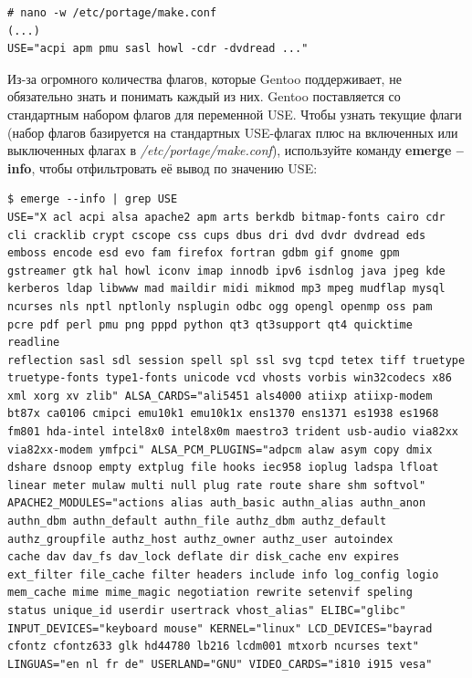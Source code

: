 \documentclass[10pt]{book}
\begin{document}
\begin{tcolorbox}
\begin{lstlisting}
# nano -w /etc/portage/make.conf
(...)
USE="acpi apm pmu sasl howl -cdr -dvdread ..."
\end{lstlisting}
\end{tcolorbox}

Из-за огромного количества флагов, которые Gentoo поддерживает, не обязательно знать и понимать каждый из них. Gentoo поставляется со стандартным набором флагов для переменной USE.
Чтобы узнать текущие флаги (набор флагов базируется на стандартных USE-флагах плюс на включенных или выключенных флагах в  \textit{/etc/portage/make.conf}), используйте команду \textbf{emerge --info}, чтобы отфильтровать её вывод по значению USE:

\begin{tcolorbox}
\begin{lstlisting}
$ emerge --info | grep USE
USE="X acl acpi alsa apache2 apm arts berkdb bitmap-fonts cairo cdr
cli cracklib crypt cscope css cups dbus dri dvd dvdr dvdread eds
emboss encode esd evo fam firefox fortran gdbm gif gnome gpm
gstreamer gtk hal howl iconv imap innodb ipv6 isdnlog java jpeg kde
kerberos ldap libwww mad maildir midi mikmod mp3 mpeg mudflap mysql
ncurses nls nptl nptlonly nsplugin odbc ogg opengl openmp oss pam
pcre pdf perl pmu png pppd python qt3 qt3support qt4 quicktime readline
reflection sasl sdl session spell spl ssl svg tcpd tetex tiff truetype
truetype-fonts type1-fonts unicode vcd vhosts vorbis win32codecs x86
xml xorg xv zlib" ALSA_CARDS="ali5451 als4000 atiixp atiixp-modem
bt87x ca0106 cmipci emu10k1 emu10k1x ens1370 ens1371 es1938 es1968
fm801 hda-intel intel8x0 intel8x0m maestro3 trident usb-audio via82xx
via82xx-modem ymfpci" ALSA_PCM_PLUGINS="adpcm alaw asym copy dmix
dshare dsnoop empty extplug file hooks iec958 ioplug ladspa lfloat
linear meter mulaw multi null plug rate route share shm softvol"
APACHE2_MODULES="actions alias auth_basic authn_alias authn_anon
authn_dbm authn_default authn_file authz_dbm authz_default
authz_groupfile authz_host authz_owner authz_user autoindex
cache dav dav_fs dav_lock deflate dir disk_cache env expires
ext_filter file_cache filter headers include info log_config logio
mem_cache mime mime_magic negotiation rewrite setenvif speling
status unique_id userdir usertrack vhost_alias" ELIBC="glibc"
INPUT_DEVICES="keyboard mouse" KERNEL="linux" LCD_DEVICES="bayrad
cfontz cfontz633 glk hd44780 lb216 lcdm001 mtxorb ncurses text"
LINGUAS="en nl fr de" USERLAND="GNU" VIDEO_CARDS="i810 i915 vesa"
\end{lstlisting}
\end{tcolorbox}
\end{document}
